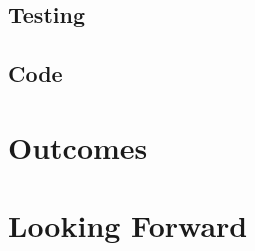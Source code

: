 \documentclass{tufte-book}
\begin{document}
		\section{Testing}\label{sec:testing}
			

		\section{Code}\label{sec:code}
			

		\cleardoublepage



	\chapter{Outcomes}\label{ch:outcomes}
		

		\cleardoublepage



	\chapter{Looking Forward}\label{ch:looking-forward}
		

		\cleardoublepage



	\backmatter
		
		
\end{document}
